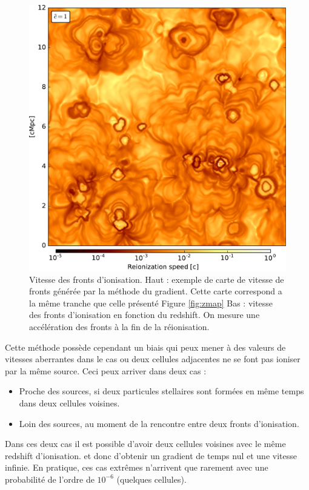 \begin{figure}
        \includegraphics[width=.95\linewidth]{img/04_mapreio/map_v_c1.pdf} 
        
        \caption[Vitesse des fronts d'ionisation]{Vitesse des fronts d'ionisation.
        Haut : exemple de carte de vitesse de fronts générée par la méthode du gradient.
		Cette carte correspond a la même tranche que celle présenté Figure \ref{fig:zmap}
		Bas : vitesse des fronts d'ionisation en fonction du redshift.
        On mesure une accélération des fronts à la fin de la réionisation.
        }
 		\label{fig:vmap}
\end{figure}

Cette méthode possède cependant un biais qui peux mener à des valeurs de vitesses aberrantes dans le cas ou deux cellules adjacentes ne se font pas ioniser par la même source.
Ceci peux arriver dans deux cas : 
\begin{itemize}
\item Proche des sources, si deux particules stellaires sont formées en même temps dans deux cellules voisines.
\item Loin des sources, au moment de la rencontre entre deux fronts d'ionisation.
\end{itemize}

Dans ces deux cas il est possible d'avoir deux cellules voisines avec le même redshift d'ionisation. et donc d'obtenir un gradient de temps nul et une vitesse infinie.
En pratique, ces cas extrêmes n'arrivent que rarement avec une probabilité de l'ordre de $10^{-6}$ (quelques cellules).





